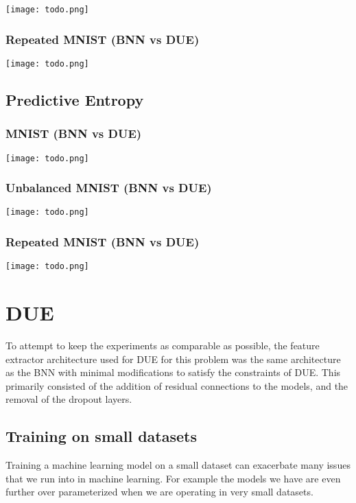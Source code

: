 \documentclass[12pt, a4paper]{report}
\theoremstyle{definition}
\theoremstyle{definition}
\theoremstyle{definition}
\begin{document}
\texttt{[image: todo.png]}

\subsubsection{Repeated MNIST (BNN vs DUE)}

\texttt{[image: todo.png]}


\subsection{Predictive Entropy}

\subsubsection{MNIST (BNN vs DUE)}

\texttt{[image: todo.png]}

\subsubsection{Unbalanced MNIST (BNN vs DUE)}

\texttt{[image: todo.png]}

\subsubsection{Repeated MNIST (BNN vs DUE)}

\texttt{[image: todo.png]}

\section{DUE}

To attempt to keep the experiments as comparable as possible, the feature extractor architecture used for DUE for this problem was the same architecture as the BNN with minimal modifications to satisfy the constraints of DUE. This primarily consisted of the addition of residual connections to the models, and the removal of the dropout layers.


\subsection{Training on small datasets}

Training a machine learning model on a small dataset can exacerbate many issues that we run into in machine learning. For example the models we have are even further over parameterized when we are operating in very small datasets.
\end{document}
